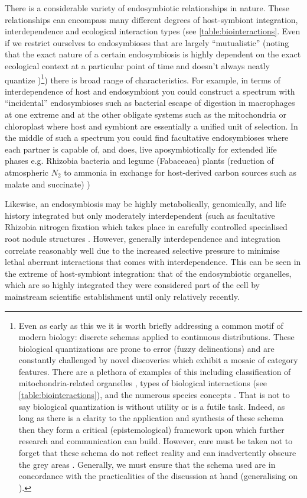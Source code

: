 There is a considerable variety of endosymbiotic relationships in nature. These relationships can encompass many different
degrees of host-symbiont integration, interdependence and ecological interaction types (see \ref{table:biointeractions}.  
Even if we restrict ourselves to endosymbioses that are largely ``mutualistic'' (noting that the exact nature of
a certain endosymbiosis is highly dependent on the exact ecological context at a particular point of time and doesn't
always neatly quantize \citep{Leung2008})\footnote{Even as early as this we 
    it is worth briefly addressing a common motif of modern biology: discrete schemas applied to 
    continuous distributions.  These biological quantizations are prone to error (fuzzy delineations)
    and are constantly challenged by novel discoveries which exhibit a mosaic of category features.  
    There are a plethora of examples of this including classification of 
    mitochondria-related organelles \citep{Maguire2014}, types of biological interactions 
    (see \ref{table:biointeractions}), and the numerous species concepts \citep{DeQueiroz2007,Boenigk2012}.
    That is not to say biological quantization is without utility or is a futile task.  Indeed, as long as there is a clarity to 
    the application and synthesis of these schema then they form a critical (epistemological) framework upon which further 
    research and communication can build. 
    However, care must be taken not to forget that these schema do not reflect reality and can inadvertently obscure
    the grey areas \citep{Leung2008}.  Generally, we must ensure that the schema used are in concordance with the practicalities of the 
discussion at hand (generalising on \citep{Boenigk2012}).}) there is broad range of characteristics.
For example, in terms of interdependence of host and endosymbiont you could construct a spectrum with ``incidental'' endosymbioses 
such as bacterial escape of digestion in macrophages at one extreme and at the other obligate systems such as the mitochondria or chloroplast 
where host and symbiont are essentially a unified unit of selection.  In the middle of such a spectrum you could find facultative endosymbioses
where each partner is capable of, and does, live aposymbiotically for extended life phases e.g. Rhizobia bacteria and legume (Fabaceaea) plants 
(reduction of atmospheric \(N_{2}\) to ammonia \citep{Hirsch1992} in exchange for host-derived carbon sources such as malate and succinate) \citep{Prell2006})

Likewise, an endosymbiosis may be highly metabolically, genomically, and life history integrated but only moderately interdependent (such as facultative Rhizobia nitrogen fixation which takes place
in carefully controlled specialised root nodule structures \citep{Crespi2008}.  However, generally interdependence and integration correlate reasonably
well due to the increased selective pressure to minimise lethal aberrant interactions that comes with interdependence.  This can be seen 
in the extreme of host-symbiont integration: that of the endosymbiotic organelles, which are so highly integrated they were considered part of the cell by
mainstream scientific establishment until only relatively recently.

